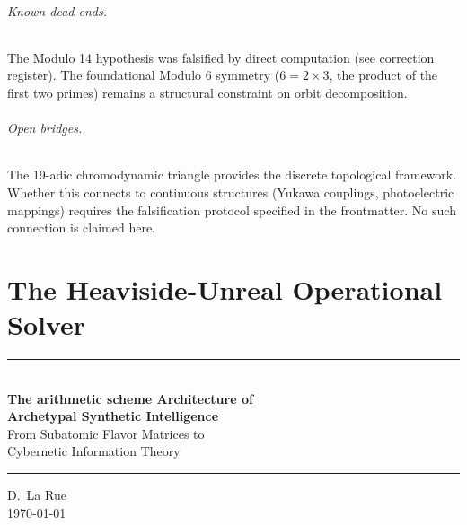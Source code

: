 \paragraph{Known dead ends.} The Modulo 14 hypothesis was falsified by direct computation (see correction register). The foundational Modulo 6 symmetry ($6 = 2 \times 3$, the product of the first two primes) remains a structural constraint on orbit decomposition.

\paragraph{Open bridges.} The 19-adic chromodynamic triangle provides the discrete topological framework. Whether this connects to continuous structures (Yukawa couplings, photoelectric mappings) requires the falsification protocol specified in the frontmatter. No such connection is claimed here.

\part{The Heaviside-Unreal Operational Solver}
\begin{center}
    \rule{0.8\textwidth}{1pt}\vspace{1em}\\
    {\color{white}\LARGE\textbf{The arithmetic scheme Architecture of}}\\[0.3em]
    {\color{white}\LARGE\textbf{Archetypal Synthetic Intelligence}}\\[0.8em]
    {\color{arithmetic scheme}\large From Subatomic Flavor Matrices to}\\
    {\color{arithmetic scheme}\large Cybernetic Information Theory}\\
    \vspace{1em}\rule{0.8\textwidth}{1pt}
\end{center}

\begin{center}
    \vspace{1em}\textcolor{derivative}{D.~La Rue}\\
    \vspace{0.5em}\textcolor{gauge3}{\today}
\end{center}


